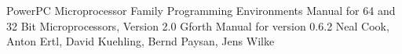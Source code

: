 \begin{thebibliography}{4}
 PowerPC Microprocessor Family Programming
Environments Manual for 64 and 32 Bit Microprocessors, Version 2.0
 Gforth Manual for version 0.6.2 Neal Cook,
Anton Ertl, David Kuehling, Bernd Paysan, Jens Wilke
\end{thebibliography}
